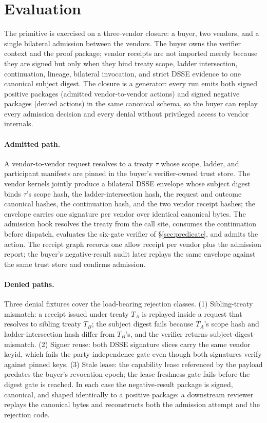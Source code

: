 \section{Evaluation}
\label{sec:evaluation}

The primitive is exercised on a three-vendor closure: a buyer, two vendors, and a single bilateral admission between the vendors. The buyer owns the verifier context and the proof package; vendor receipts are not imported merely because they are signed but only when they bind treaty scope, ladder intersection, continuation, lineage, bilateral invocation, and strict DSSE evidence to one canonical subject digest. The closure is a generator: every run emits both signed positive packages (admitted vendor-to-vendor actions) and signed negative packages (denied actions) in the same canonical schema, so the buyer can replay every admission decision and every denial without privileged access to vendor internals.

\paragraph{Admitted path.} A vendor-to-vendor request resolves to a treaty $\tau$ whose scope, ladder, and participant manifests are pinned in the buyer's verifier-owned trust store. The vendor kernels jointly produce a bilateral DSSE envelope whose subject digest binds $\tau$'s scope hash, the ladder-intersection hash, the request and outcome canonical hashes, the continuation hash, and the two vendor receipt hashes; the envelope carries one signature per vendor over identical canonical bytes. The admission hook resolves the treaty from the call site, consumes the continuation before dispatch, evaluates the six-gate verifier of \S\ref{sec:predicate}, and admits the action. The receipt graph records one allow receipt per vendor plus the admission report; the buyer's negative-result audit later replays the same envelope against the same trust store and confirms admission.

\paragraph{Denied paths.} Three denial fixtures cover the load-bearing rejection classes. (1) Sibling-treaty mismatch: a receipt issued under treaty $T_A$ is replayed inside a request that resolves to sibling treaty $T_B$; the subject digest fails because $T_A$'s scope hash and ladder-intersection hash differ from $T_B$'s, and the verifier returns subject-digest-mismatch. (2) Signer reuse: both DSSE signature slices carry the same vendor keyid, which fails the party-independence gate even though both signatures verify against pinned keys. (3) Stale lease: the capability lease referenced by the payload predates the buyer's revocation epoch; the lease-freshness gate fails before the digest gate is reached. In each case the negative-result package is signed, canonical, and shaped identically to a positive package: a downstream reviewer replays the canonical bytes and reconstructs both the admission attempt and the rejection code.

